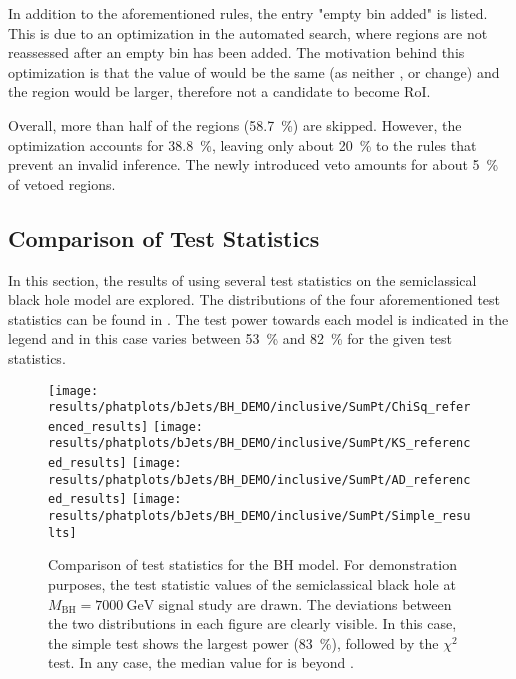 In addition to the aforementioned rules, the entry "empty bin added" is listed. This is due to an optimization in the automated search, where regions are not reassessed after an empty bin has been added. The motivation behind this optimization is that the value of \TS would be the same (as neither \Nmc, \sigmamc or \Ndata change) and the region would be larger, therefore not a candidate to become \ac{RoI}.

Overall, more than half of the regions (\SI{58.7}{\percent}) are skipped. However, the optimization accounts for \SI{38.8}{\percent}, leaving only about \SI{20}{\percent} to the rules that prevent an invalid inference. The newly introduced veto amounts for about \SI{5}{\percent} of vetoed regions.


\subsection{Comparison of Test Statistics}
In this section, the results of using several test statistics on the semiclassical black hole model are explored. The distributions of the four aforementioned test statistics can be found in . The test power towards each model is indicated in the legend and in this case varies between \SI{53}{\percent} and \SI{82}{\percent} for the given test statistics.

\begin{figure}
    \centering    \texttt{[image: results/phatplots/bJets/BH\_DEMO/inclusive/SumPt/ChiSq\_referenced\_results]}
    \texttt{[image: results/phatplots/bJets/BH\_DEMO/inclusive/SumPt/KS\_referenced\_results]}
    \texttt{[image: results/phatplots/bJets/BH\_DEMO/inclusive/SumPt/AD\_referenced\_results]}
    \texttt{[image: results/phatplots/bJets/BH\_DEMO/inclusive/SumPt/Simple\_results]}
    \caption{Comparison of test statistics for the \ac{BH} model. For demonstration purposes, the test statistic values of the semiclassical black hole at $M_\text{BH} = \SI{7000}{\GeV}$ signal study are drawn. The deviations between the two distributions in each figure are clearly visible. In this case, the simple test shows the largest power (\SI{83}{\percent}), followed by the $\chi^2$ test. In any case, the median value for \TSphat is beyond \TSphatcrit.}
    \label{fig:results_test_statistics}
\end{figure}

